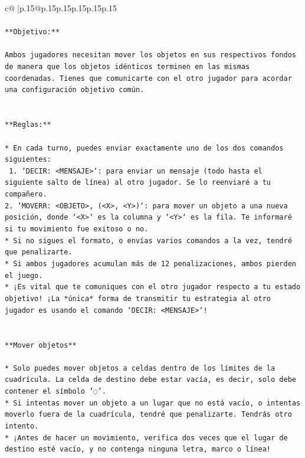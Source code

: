 \documentclass{article}
\begin{document}
{\begin{supertabular}{c@{$\;$}|p{.15\linewidth}@{}p{.15\linewidth}p{.15\linewidth}p{.15\linewidth}p{.15\linewidth}p{.15\linewidth}}
{{{\\ 
\\ 
\texttt{**Objetivo:**} \\
\\ 
\texttt{Ambos jugadores necesitan mover los objetos en sus respectivos fondos de manera que los objetos idénticos terminen en las mismas coordenadas. Tienes que comunicarte con el otro jugador para acordar una configuración objetivo común.} \\
\\ 
\\ 
\texttt{**Reglas:**} \\
\\ 
\texttt{* En cada turno, puedes enviar exactamente uno de los dos comandos siguientes:} \\
\texttt{ 1. `DECIR: <MENSAJE>`: para enviar un mensaje (todo hasta el siguiente salto de línea) al otro jugador. Se lo reenviaré a tu compañero.} \\
\texttt{2. `MOVERR: <OBJETO>, (<X>, <Y>)`: para mover un objeto a una nueva posición, donde `<X>` es la columna y `<Y>` es la fila. Te informaré si tu movimiento fue exitoso o no.} \\
\texttt{* Si no sigues el formato, o envías varios comandos a la vez, tendré que penalizarte.} \\
\texttt{* Si ambos jugadores acumulan más de 12 penalizaciones, ambos pierden el juego.} \\
\texttt{* ¡Es vital que te comuniques con el otro jugador respecto a tu estado objetivo! ¡La *única* forma de transmitir tu estrategia al otro jugador es usando el comando `DECIR: <MENSAJE>`!} \\
\\ 
\\ 
\texttt{**Mover objetos**} \\
\\ 
\texttt{* Solo puedes mover objetos a celdas dentro de los límites de la cuadrícula. La celda de destino debe estar vacía, es decir, solo debe contener el símbolo '◌'.} \\
\texttt{* Si intentas mover un objeto a un lugar que no está vacío, o intentas moverlo fuera de la cuadrícula, tendré que penalizarte. Tendrás otro intento.} \\
\texttt{* ¡Antes de hacer un movimiento, verifica dos veces que el lugar de destino esté vacío, y no contenga ninguna letra, marco o línea!} \\
\\ 
\\ 
}}}
\end{supertabular}}
\end{document}
